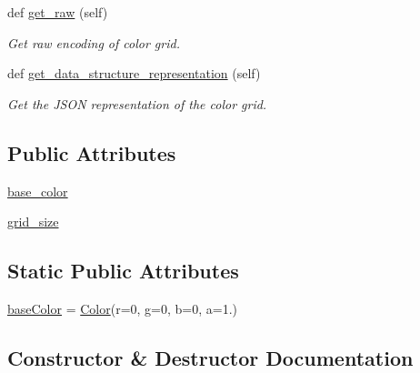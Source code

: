 \begin{DoxyCompactItemize}
def \mbox{\hyperlink{classbridges_1_1color__grid_1_1_color_grid_ab6685633fe237eb118cf2db2f624cd60}{get\+\_\+raw}} (self)
\begin{DoxyCompactList}\small\item\em Get raw encoding of color grid. \end{DoxyCompactList}\item 
def \mbox{\hyperlink{classbridges_1_1color__grid_1_1_color_grid_afda80f44711e0c32c96161d1e681d788}{get\+\_\+data\+\_\+structure\+\_\+representation}} (self)
\begin{DoxyCompactList}\small\item\em Get the J\+S\+ON representation of the color grid. \end{DoxyCompactList}\end{DoxyCompactItemize}
\subsection*{Public Attributes}
\begin{DoxyCompactItemize}
\item 
\mbox{\hyperlink{classbridges_1_1color__grid_1_1_color_grid_af7c28369f01fb4dfc82a5824583a6dbf}{base\+\_\+color}}
\item 
\mbox{\hyperlink{classbridges_1_1color__grid_1_1_color_grid_af248634de8b3d7b92feef01eed40821b}{grid\+\_\+size}}
\end{DoxyCompactItemize}
\subsection*{Static Public Attributes}
\begin{DoxyCompactItemize}
\item 
\mbox{\hyperlink{classbridges_1_1color__grid_1_1_color_grid_ad2db62703be80114e46b490ff02f8bd9}{base\+Color}} = \mbox{\hyperlink{classbridges_1_1color_1_1_color}{Color}}(r=0, g=0, b=0, a=1.)
\end{DoxyCompactItemize}


\subsection{Constructor \& Destructor Documentation}
\mbox{\label{classbridges_1_1color__grid_1_1_color_grid_aa4b484e518b5fc0c970ea36e8500dbe5}} 
